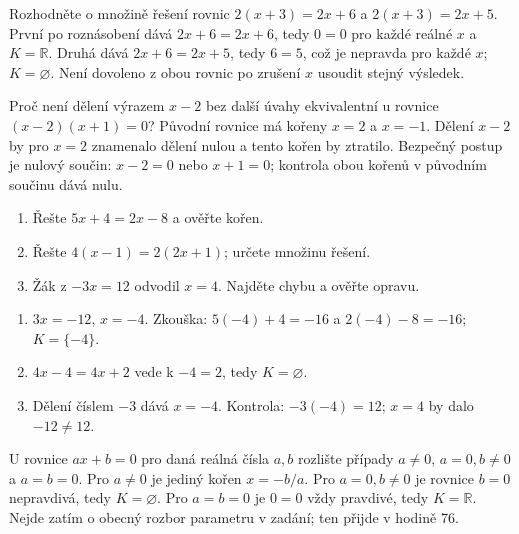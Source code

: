 \documentclass[11pt,a4paper]{article}
\begin{document}
\newpage
{}
\begin{prikladReseniBox}[breakable=false]
Rozhodněte o množině řešení rovnic $2(x+3)=2x+6$ a $2(x+3)=2x+5$.
\tcblower
První po roznásobení dává $2x+6=2x+6$, tedy $0=0$ pro každé reálné $x$ a $K=\mathbb R$. Druhá dává $2x+6=2x+5$, tedy $6=5$, což je nepravda pro každé $x$; $K=\varnothing$. Není dovoleno z obou rovnic po zrušení $x$ usoudit stejný výsledek.
\end{prikladReseniBox}
\begin{prikladReseniBox}[breakable=false]
Proč není dělení výrazem $x-2$ bez další úvahy ekvivalentní u rovnice $(x-2)(x+1)=0$?
\tcblower
Původní rovnice má kořeny $x=2$ a $x=-1$. Dělení $x-2$ by pro $x=2$ znamenalo dělení nulou a tento kořen by ztratilo. Bezpečný postup je nulový součin: $x-2=0$ nebo $x+1=0$; kontrola obou kořenů v původním součinu dává nulu.
\end{prikladReseniBox}
\begin{zadaniReseniBox}
\begin{enumerate}[label=\alph*)]
\item Řešte $5x+4=2x-8$ a ověřte kořen.
\item Řešte $4(x-1)=2(2x+1)$; určete množinu řešení.
\item Žák z $-3x=12$ odvodil $x=4$. Najděte chybu a ověřte opravu.
\end{enumerate}
\tcblower
\begin{enumerate}[label=\alph*)]
\item $3x=-12$, $x=-4$. Zkouška: $5(-4)+4=-16$ a $2(-4)-8=-16$; $K=\{-4\}$.
\item $4x-4=4x+2$ vede k $-4=2$, tedy $K=\varnothing$.
\item Dělení číslem $-3$ dává $x=-4$. Kontrola: $-3(-4)=12$; $x=4$ by dalo $-12\ne12$.
\end{enumerate}
\end{zadaniReseniBox}
\begin{zadaniReseniBox}
U rovnice $a x+b=0$ pro daná reálná čísla $a,b$ rozlište případy $a\ne0$, $a=0,b\ne0$ a $a=b=0$.
\tcblower
Pro $a\ne0$ je jediný kořen $x=-b/a$. Pro $a=0,b\ne0$ je rovnice $b=0$ nepravdivá, tedy $K=\varnothing$. Pro $a=b=0$ je $0=0$ vždy pravdivé, tedy $K=\mathbb R$. Nejde zatím o obecný rozbor parametru v zadání; ten přijde v hodině 76.
\end{zadaniReseniBox}
\end{document}
